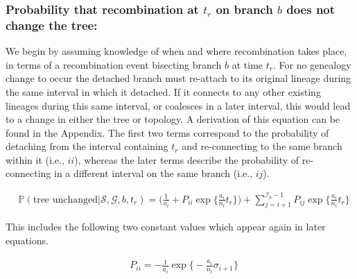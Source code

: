 \documentclass[11pt]{article}
\begin{document}
\subsubsection{Probability that recombination at $t_r$ on branch $b$ does not change the tree:}
We begin by assuming knowledge of when and where recombination takes place, in terms 
of a recombination event bisecting branch $b$ at time $t_r$. %
For no genealogy change to occur the detached branch must re-attach to its original 
lineage during the same interval in which it detached.
If it connects to any other existing lineages during this same interval, 
or coalesces in a later interval, this would lead to a change in either the 
tree or topology. A derivation of this equation can be found in the Appendix.
The first two terms correspond to the probability of detaching from the interval 
containing $t_r$ and re-connecting to the same branch within it (i.e., $ii$), 
whereas the later terms describe the probability of re-connecting in a different interval
on the same branch (i.e., $ij$).


\begin{equation}
\begin{aligned}
	&\mathbb{P}(\text{tree unchanged} | \mathcal{S},\mathcal{G},b,t_r) = 
	\bigg(\frac{1}{a_i} +P_{ii} \exp \bigg\{\frac{a_i}{n_i}t_r\bigg\}\bigg) + 
	\sum_{j=i+1}^{\mathcal{I}_b - 1} P_{ij} \exp\bigg\{\frac{a_i}{n_i}t_r\bigg\} 
\end{aligned}
\end{equation}

\noindent This includes the following two constant values which appear again 
in later equations.

\begin{equation}
\begin{aligned}
	&P_{ii} = - \frac{1}{a_i} \exp \bigg\{-\frac{a_i}{n_i}\sigma_{i + 1} \bigg\} 	
\end{aligned}
\end{equation}
\end{document}
